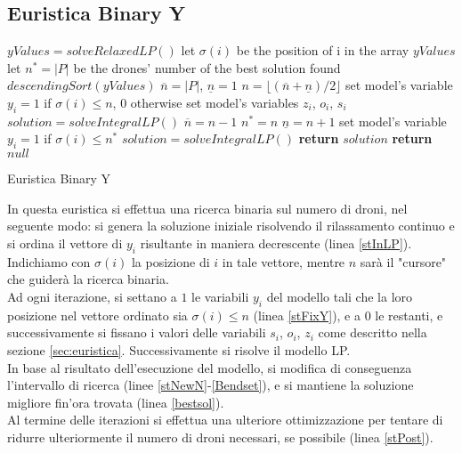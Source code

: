 \subsection{Euristica Binary Y}
\begin{algorithm}
	\begin{algorithmic}[1]
		\State $yValues = solveRelaxedLP()$ \label{Bsolver1}
		\State let $\sigma(i)$ be the position of i in the array $yValues$
		\State let $n^* = |P| $ be the drones' number of the best solution found
		\State $descendingSort(yValues)$ \label{stInLP}
		\State $\overline{n} =|P|$,  $\underline{n} = 1$ \label{Binit}
		 \label{Bwhile}
			\State $n = \lfloor (\overline{n} + \underline{n}) / 2 \rfloor$ 
			\State set model's variable $y_i = 1$ if $\sigma(i) \leq n$, 0 otherwise \label{stFixY}  
			\State set model's variables $z_i$, $o_i$, $s_i$
			\State $solution = solveIntegralLP()$ \label{Bsolvei}
			 \label{stNewN}
				\State $\overline{n} = n -1$
					\State $n^* = n$ \label{bestsol}
				\EndIf
			\Else
				\State $\underline{n} = n + 1$ \label{Bendset}
			\EndIf	
		\EndWhile
		\State set model's variable $y_i = 1$ if $\sigma(i) \leq n^*$ \label{stPost}
		\State $solution = solveIntegralLP()$ 
		 \label{Bifsolved}
			\State \textbf{return} $solution$ \label{Bretsol}
		\Else
			\State \textbf{return} $null$
		\EndIf
			
	\end{algorithmic}
	\caption{Euristica Binary Y\label{alg:Binheuristic}}
\end{algorithm}

In questa euristica si effettua una ricerca binaria sul numero di droni, nel seguente modo: si genera la soluzione iniziale risolvendo il rilassamento continuo e si ordina il vettore di $y_i$ risultante in maniera decrescente (linea \ref{stInLP}). Indichiamo con $\sigma(i)$ la posizione di $i$ in tale vettore, mentre $n$ sarà il "cursore" che guiderà la ricerca binaria. \\
Ad ogni iterazione, si settano a $1$ le variabili $y_i$ del modello tali che la loro posizione nel vettore ordinato sia $\sigma(i) \leq n$ (linea \ref{stFixY}), e a $0$ le restanti, e successivamente si fissano i valori delle variabili $s_i$, $o_i$, $z_i$ come descritto nella sezione \ref{sec:euristica}. Successivamente si risolve il modello LP. \\
In base al risultato dell'esecuzione del modello, si modifica di conseguenza l'intervallo di ricerca (linee \ref{stNewN}-\ref{Bendset}), e si mantiene la soluzione migliore fin'ora trovata (linea \ref{bestsol}).\\
Al termine delle iterazioni si effettua una ulteriore ottimizzazione per tentare di ridurre ulteriormente il numero di droni necessari, se possibile (linea \ref{stPost}).	\\
